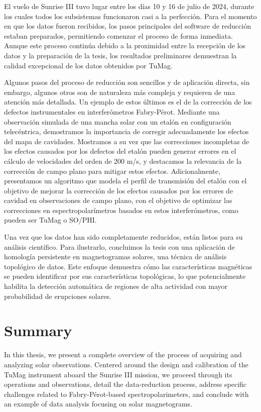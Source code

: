 \documentclass[12pt]{mythesis}
\begin{document}
El vuelo de Sunrise III tuvo lugar entre los días 10 y 16 de julio de 2024, durante los cuales todos los subsistemas funcionaron casi a la perfección. Para el momento en que los datos fueron recibidos, los pasos principales del software de reducción estaban preparados, permitiendo comenzar el proceso de forma inmediata. Aunque este proceso continúa debido a la proximidad entre la recepción de los datos y la preparación de la tesis, los resultados preliminares demuestran la calidad excepcional de los datos obtenidos por TuMag.

Algunos pasos del proceso de reducción son sencillos y de aplicación directa, sin embargo, algunos otros son de naturaleza más compleja y requieren de una atención más detallada. Un ejemplo de estos últimos es el de la corrección de los defectos instrumentales en interferómetros Fabry-Pérot. Mediante una observación simulada de una mancha solar con un etalón en configuración telecéntrica, demostramos la importancia de corregir adecuadamente los efectos del mapa de cavidades. Mostramos a su vez que las correcciones incompletas de los efectos causados por los defectos del etalón pueden generar errores en el cálculo de velocidades del orden de 200 m/s, y destacamos la relevancia de la corrección de campo plano para mitigar estos efectos. Adicionalmente, presentamos un algoritmo que modela el perfil de transmisión del etalón con el objetivo de mejorar la corrección de los efectos causados por los errores de cavidad en observaciones de campo plano, con el objetivo de optimizar las correcciones en espectropolarímetros basados en estos interferómetros, como pueden ser TuMag o SO/PHI.

Una vez que los datos han sido completamente reducidos, están listos para su análisis científico. Para ilustrarlo, concluimos la tesis con una aplicación de homología persistente en magnetogramas solares, una técnica de análisis topológico de datos. Este enfoque demuestra cómo las características magnéticas se pueden identificar por sus características topológicas, lo que potencialmente habilita la detección automática de regiones de alta actividad con mayor probabilidad de erupciones solares.                   


\chapter*{Summary}

In this thesis, we present a complete overview of the process of acquiring and analyzing solar observations. Centered around the design and calibration of the TuMag instrument aboard the Sunrise III mission, we proceed through its operations and observations, detail the data-reduction process, address specific challenges related to Fabry-Pérot-based spectropolarimeters, and conclude with an example of data analysis focusing on solar magnetograms.
\end{document}
